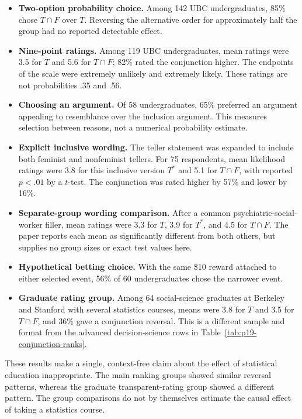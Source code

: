 \begin{itemize}
\item \textbf{Two-option probability choice.}
      Among 142 UBC undergraduates, 85\% chose \(T\cap F\) over \(T\).
      Reversing the alternative order for approximately half the group
      had no reported detectable effect.
\item \textbf{Nine-point ratings.}
      Among 119 UBC undergraduates, mean ratings were 3.5 for \(T\)
      and 5.6 for \(T\cap F\); 82\% rated the conjunction higher.
      The endpoints of the scale were extremely unlikely and extremely
      likely. These ratings are not probabilities .35 and .56.
\item \textbf{Choosing an argument.}
      Of 58 undergraduates, 65\% preferred an argument appealing to
      resemblance over the inclusion argument. This measures selection
      between reasons, not a numerical probability estimate.
\item \textbf{Explicit inclusive wording.}
      The teller statement was expanded to include both feminist and
      nonfeminist tellers. For 75 respondents, mean likelihood ratings
      were 3.8 for this inclusive version \(T^*\) and 5.1 for \(T\cap F\),
      with reported \(p<.01\) by a \(t\)-test. The conjunction was rated
      higher by 57\% and lower by 16\%.
\item \textbf{Separate-group wording comparison.}
      After a common psychiatric-social-worker filler, mean ratings
      were 3.3 for \(T\), 3.9 for \(T^*\), and 4.5 for \(T\cap F\).
      The paper reports each mean as significantly different from both
      others, but supplies no group sizes or exact test values here.
\item \textbf{Hypothetical betting choice.}
      With the same \$10 reward attached to either selected event,
      56\% of 60 undergraduates chose the narrower event.
\item \textbf{Graduate rating group.}
      Among 64 social-science graduates at Berkeley and Stanford with
      several statistics courses, means were 3.8 for \(T\) and 3.5
      for \(T\cap F\), and 36\% gave a conjunction reversal.
      This is a different sample and format from the advanced
      decision-science rows in Table~\ref{tab:p19-conjunction-ranks}.
\end{itemize}

These results make a single, context-free claim about the effect of
statistical education inappropriate. The main ranking groups showed
similar reversal patterns, whereas the graduate transparent-rating
group showed a different pattern. The group comparisons do not by
themselves estimate the causal effect of taking a statistics course.

